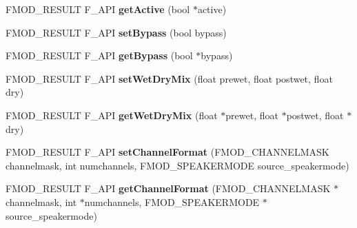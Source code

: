 \begin{DoxyCompactItemize}
\item 
\hypertarget{class_f_m_o_d_1_1_d_s_p_ac802a3beb3dfb2dca8cd2717926a3413}{F\+M\+O\+D\+\_\+\+R\+E\+S\+U\+L\+T F\+\_\+\+A\+P\+I {\bfseries get\+Active} (bool $\ast$active)}\label{class_f_m_o_d_1_1_d_s_p_ac802a3beb3dfb2dca8cd2717926a3413}

\item 
\hypertarget{class_f_m_o_d_1_1_d_s_p_ac0e9c1d934542b45a8ec39f488de559a}{F\+M\+O\+D\+\_\+\+R\+E\+S\+U\+L\+T F\+\_\+\+A\+P\+I {\bfseries set\+Bypass} (bool bypass)}\label{class_f_m_o_d_1_1_d_s_p_ac0e9c1d934542b45a8ec39f488de559a}

\item 
\hypertarget{class_f_m_o_d_1_1_d_s_p_a019b1b2e5b980dc4d4b70c1c86fe4240}{F\+M\+O\+D\+\_\+\+R\+E\+S\+U\+L\+T F\+\_\+\+A\+P\+I {\bfseries get\+Bypass} (bool $\ast$bypass)}\label{class_f_m_o_d_1_1_d_s_p_a019b1b2e5b980dc4d4b70c1c86fe4240}

\item 
\hypertarget{class_f_m_o_d_1_1_d_s_p_a1070de2d840d88b7fee21aab37016053}{F\+M\+O\+D\+\_\+\+R\+E\+S\+U\+L\+T F\+\_\+\+A\+P\+I {\bfseries set\+Wet\+Dry\+Mix} (float prewet, float postwet, float dry)}\label{class_f_m_o_d_1_1_d_s_p_a1070de2d840d88b7fee21aab37016053}

\item 
\hypertarget{class_f_m_o_d_1_1_d_s_p_a7e0ef3f97f823000de321c7f69c633b0}{F\+M\+O\+D\+\_\+\+R\+E\+S\+U\+L\+T F\+\_\+\+A\+P\+I {\bfseries get\+Wet\+Dry\+Mix} (float $\ast$prewet, float $\ast$postwet, float $\ast$dry)}\label{class_f_m_o_d_1_1_d_s_p_a7e0ef3f97f823000de321c7f69c633b0}

\item 
\hypertarget{class_f_m_o_d_1_1_d_s_p_a1cf7028a5dad21c9b25b0a1c740d9fa2}{F\+M\+O\+D\+\_\+\+R\+E\+S\+U\+L\+T F\+\_\+\+A\+P\+I {\bfseries set\+Channel\+Format} (F\+M\+O\+D\+\_\+\+C\+H\+A\+N\+N\+E\+L\+M\+A\+S\+K channelmask, int numchannels, F\+M\+O\+D\+\_\+\+S\+P\+E\+A\+K\+E\+R\+M\+O\+D\+E source\+\_\+speakermode)}\label{class_f_m_o_d_1_1_d_s_p_a1cf7028a5dad21c9b25b0a1c740d9fa2}

\item 
\hypertarget{class_f_m_o_d_1_1_d_s_p_af8188037563561808d0b4f6b5e1034aa}{F\+M\+O\+D\+\_\+\+R\+E\+S\+U\+L\+T F\+\_\+\+A\+P\+I {\bfseries get\+Channel\+Format} (F\+M\+O\+D\+\_\+\+C\+H\+A\+N\+N\+E\+L\+M\+A\+S\+K $\ast$channelmask, int $\ast$numchannels, F\+M\+O\+D\+\_\+\+S\+P\+E\+A\+K\+E\+R\+M\+O\+D\+E $\ast$source\+\_\+speakermode)}\label{class_f_m_o_d_1_1_d_s_p_af8188037563561808d0b4f6b5e1034aa}


\end{DoxyCompactItemize}
